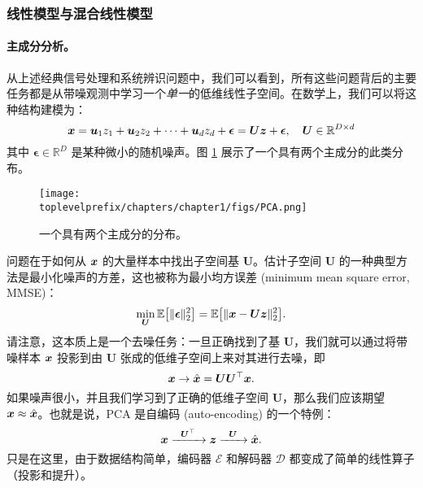 \documentclass[../../book-main.tex]{subfiles}
\begin{document}

\subsubsection{线性模型与混合线性模型}
\label{sec:PCA-ICA}
\paragraph{主成分分析。}
从上述经典信号处理和系统辨识问题中，我们可以看到，所有这些问题背后的主要任务都是从带噪观测中学习一个{\em 单一}的低维线性子空间。在数学上，我们可以将这种结构建模为：
\begin{equation}
    \bm{x} = \boldsymbol{u}_1 z_1 + \boldsymbol{u}_2 z_2 + \cdots + \boldsymbol{u}_d z_d + \boldsymbol{\epsilon} =  \boldsymbol{U} \bm{z} + \boldsymbol{\epsilon}, \quad \boldsymbol{U} \in \mathbb{R}^{D\times d}
    \label{eqn:PCA-model}
\end{equation}
其中 $\boldsymbol{\epsilon} \in \mathbb{R}^D$ 是某种微小的随机噪声。图 \ref{fig:PCA} 展示了一个具有两个主成分的此类分布。
\begin{figure}
    \centering
    \texttt{[image: \\toplevelprefix/chapters/chapter1/figs/PCA.png]}
    \caption{一个具有两个主成分的分布。}
    \label{fig:PCA}
\end{figure}
问题在于如何从 $\bm{x}$ 的大量样本中找出子空间基 $\boldsymbol{U}$。估计子空间 $\boldsymbol{U}$ 的一种典型方法是最小化噪声的方差，这也被称为最小均方误差 (minimum mean square error, MMSE)：
\begin{equation}
    \min_{\boldsymbol{U}} \mathbb{E}\big[\|\boldsymbol{\epsilon}\|_2^2\big] = \mathbb{E}\big[\|\bm{x} - \boldsymbol{U} \bm{z}\|_2^2\big].
\end{equation}
请注意，这本质上是一个去噪任务：一旦正确找到了基 $\boldsymbol{U}$，我们就可以通过将带噪样本 $\bm{x}$ 投影到由 $\boldsymbol{U}$ 张成的低维子空间上来对其进行去噪，即
\begin{equation}
\bm{x} \rightarrow \hat {\bm{x}} = \boldsymbol{U}\boldsymbol{U}^\top \bm{x}. 
\end{equation}
如果噪声很小，并且我们学习到了正确的低维子空间 $\boldsymbol{U}$，那么我们应该期望 $\bm{x} \approx \hat {\bm{x}}$。也就是说，PCA 是自编码 (auto-encoding) 的一个特例：
\begin{equation}
    \bm{x}   \xrightarrow{\hspace{2mm} \boldsymbol{U}^\top\hspace{2mm}} \bm{z}  \xrightarrow{\hspace{2mm} \boldsymbol{U} \hspace{2mm}} \hat {\bm{x}}.
       \label{eqn:auto-encoding-PCA}
\end{equation}
只是在这里，由于数据结构简单，编码器 $\mathcal{E}$ 和解码器 $\mathcal{D}$ 都变成了简单的线性算子（投影和提升）。
\end{document}
